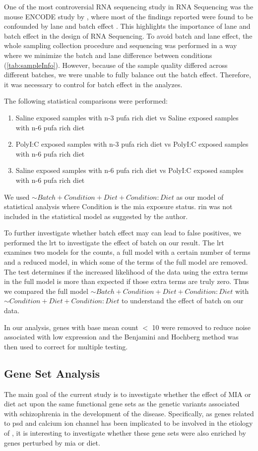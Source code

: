 One of the most controversial RNA sequencing study  in RNA Sequencing was the mouse ENCODE study by \citet{Yue2014}, where most of the findings reported were found to be confounded by lane and batch effect \citet{Gilad2015}.
This highlights the importance of lane and batch effect in the design of RNA Sequencing.
To avoid batch and lane effect, the whole sampling collection procedure and sequencing was performed in a way where we minimize the batch and lane difference between conditions (\cref{tab:sampleInfo}). 
However, because of the sample quality differed across different batches, we were unable to fully balance out the batch effect. 
Therefore, it was necessary to control for batch effect in the analyzes.

The following statistical comparisons were performed:
\begin{enumerate}
	\item Saline exposed samples with n-3 \gls{pufa} rich diet vs Saline exposed samples with n-6 \gls{pufa} rich diet 
	\item PolyI:C exposed samples with n-3 \gls{pufa} rich diet vs PolyI:C exposed samples with n-6 \gls{pufa} rich diet 
	\item Saline exposed samples with n-6 \gls{pufa} rich diet vs PolyI:C exposed samples with n-6 \gls{pufa} rich diet 
\end{enumerate}
We used $\sim Batch+Condition+Diet+Condition:Diet$ as our model of statistical analysis where Condition is the \gls{mia} exposure status.
\Gls{rin} was not included in the statistical model as suggested by the author.

To further investigate whether batch effect may can lead to false positives, we performed the \gls{lrt} to investigate the effect of batch on our result.
The \gls{lrt} examines two models for the counts, a full model with a certain number of terms and a reduced model, in which some of the terms of the full model are removed. 
The test determines if the increased likelihood of the data using the extra terms in the full model is more than expected if those extra terms are truly zero.
Thus we compared the full model $\sim Batch+Condition+Diet+Condition:Diet$ with $\sim Condition+Diet+Condition:Diet$ to understand the effect of batch on our data.

In our analysis, genes with base mean count $<$ 10 were removed to reduce noise associated with low expression and the Benjamini and Hochberg method was then used to correct for multiple testing.

\subsection{Gene Set Analysis}
\label{sec:function}
The main goal of the current study is to investigate whether the effect of MIA or diet act upon the same functional gene sets as the genetic variants associated with schizophrenia in the development of the disease. 
Specifically, as genes related to \gls{psd} \citep{Purcell2014,Consortium2015a} and calcium ion channel \citep{Purcell2014,Ripke2014,Szatkiewicz2014} has been implicated to be involved in the etiology of , it is interesting to investigate whether these gene sets were also enriched by genes perturbed by \gls{mia} or diet.

